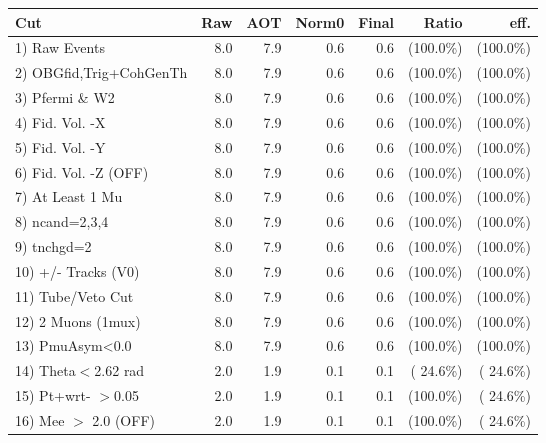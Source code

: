  \begin{table}[h!]\centering
 \begin{tabular}{||l||r|r|r|r|r|r||}
 \hline
 \hline
 Cut & Raw & AOT & Norm0 & Final & Ratio & eff.       \\
 \hline
  1) Raw Events           &          8.0 &          7.9 &          0.6 &          0.6 & (100.0\%) & (100.0\%) \\
  2) OBGfid,Trig+CohGenTh &          8.0 &          7.9 &          0.6 &          0.6 & (100.0\%) & (100.0\%) \\
  3) Pfermi \& W2         &          8.0 &          7.9 &          0.6 &          0.6 & (100.0\%) & (100.0\%) \\
  4) Fid. Vol. -X         &          8.0 &          7.9 &          0.6 &          0.6 & (100.0\%) & (100.0\%) \\
  5) Fid. Vol. -Y         &          8.0 &          7.9 &          0.6 &          0.6 & (100.0\%) & (100.0\%) \\
  6) Fid. Vol. -Z (OFF)   &          8.0 &          7.9 &          0.6 &          0.6 & (100.0\%) & (100.0\%) \\
  7) At Least 1 Mu        &          8.0 &          7.9 &          0.6 &          0.6 & (100.0\%) & (100.0\%) \\
  8) ncand=2,3,4          &          8.0 &          7.9 &          0.6 &          0.6 & (100.0\%) & (100.0\%) \\
  9) tnchgd=2             &          8.0 &          7.9 &          0.6 &          0.6 & (100.0\%) & (100.0\%) \\
 10) +/- Tracks (V0)      &          8.0 &          7.9 &          0.6 &          0.6 & (100.0\%) & (100.0\%) \\
 11) Tube/Veto Cut        &          8.0 &          7.9 &          0.6 &          0.6 & (100.0\%) & (100.0\%) \\
 12) 2 Muons (1mux)       &          8.0 &          7.9 &          0.6 &          0.6 & (100.0\%) & (100.0\%) \\
 13) PmuAsym<0.0          &          8.0 &          7.9 &          0.6 &          0.6 & (100.0\%) & (100.0\%) \\
 14) Theta$<$2.62 rad     &          2.0 &          1.9 &          0.1 &          0.1 & ( 24.6\%) & ( 24.6\%) \\
 15) Pt+wrt- $>$0.05      &          2.0 &          1.9 &          0.1 &          0.1 & (100.0\%) & ( 24.6\%) \\
 16) Mee $>$ 2.0  (OFF)   &          2.0 &          1.9 &          0.1 &          0.1 & (100.0\%) & ( 24.6\%) \\

\end{tabular}
\end{table}
